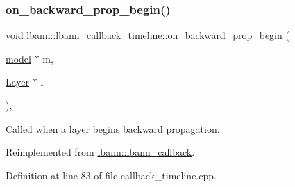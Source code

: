 \subsubsection{\texorpdfstring{on\+\_\+backward\+\_\+prop\+\_\+begin()}{on\_backward\_prop\_begin()}}
{\footnotesize\ttfamily void lbann\+::lbann\+\_\+callback\+\_\+timeline\+::on\+\_\+backward\+\_\+prop\+\_\+begin (\begin{DoxyParamCaption}\item[{\hyperlink{classlbann_1_1model}{model} $\ast$}]{m,  }\item[{\hyperlink{classlbann_1_1Layer}{Layer} $\ast$}]{l }\end{DoxyParamCaption})\hspace{0.3cm}{\ttfamily [override]}, {\ttfamily [virtual]}}

Called when a layer begins backward propagation. 

Reimplemented from \hyperlink{classlbann_1_1lbann__callback_abeb1e486e259fd358332abf1e952f630}{lbann\+::lbann\+\_\+callback}.



Definition at line 83 of file callback\+\_\+timeline.\+cpp.


